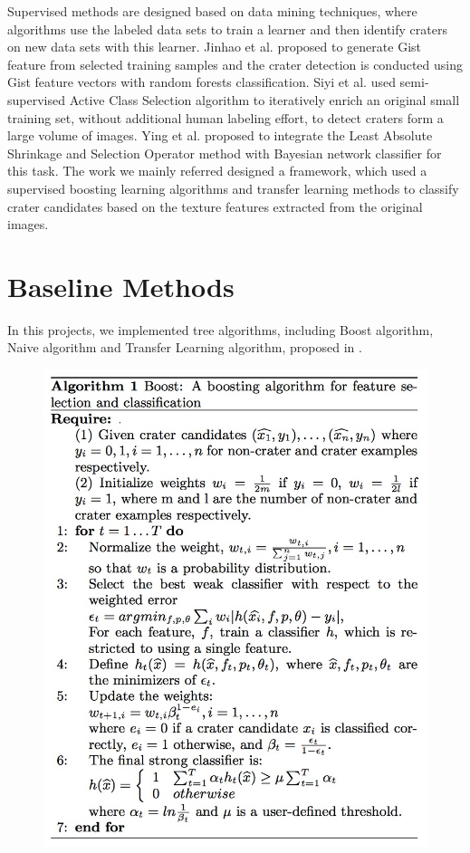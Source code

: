 \documentclass[conference]{IEEEtran}
\begin{document}
Supervised methods are designed based on data mining techniques, where algorithms use the labeled data sets to train a learner and then identify craters on new data sets with this learner. Jinhao et al. \cite{Jihao2015selected} proposed to generate Gist feature from selected training samples and the crater detection is conducted using Gist feature vectors with random forests classification. Siyi et al.\cite{siyi2011image} used semi-supervised Active Class Selection algorithm to iteratively enrich an original small training set, without additional human labeling effort, to detect craters form a large volume of images. Ying et al. \cite{ying2013crater} proposed to integrate the Least Absolute Shrinkage and Selection Operator method  with Bayesian network classifier for this task. The work we mainly referred designed a framework, which used a supervised boosting learning algorithms and transfer learning methods to classify crater candidates based on the texture features extracted from the original images.


\section{Baseline Methods}
In this projects, we implemented tree algorithms, including Boost algorithm, Naive algorithm and Transfer Learning algorithm, proposed in \cite{ding2011subkilometer}.
\begin{figure}[!h]
\begin{center}
\includegraphics[scale=0.34]{boost.png}
\label{default}
\end{center}
\end{figure}
\end{document}

